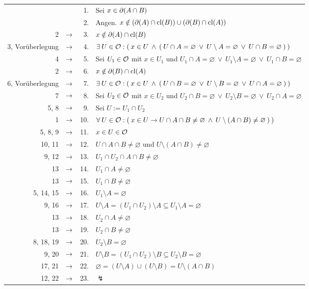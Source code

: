     \begin{longtable}{r c r l}
        & & 1. & Sei $x \in \partial(A \cap B)$ \\
        & & 2. & Angen. $x \notin (\partial(A) \cap \text{cl}(B)) \cup (\partial(B) \cap \text{cl}(A))$ \\
        2 & $\rightarrow$ & 3. & $x \notin \partial(A) \cap \text{cl}(B)$ \\
        3, Vorüberlegung & $\rightarrow$ & 4. & $\exists\: U \in \mathcal{O}: (\: x \in U \:\land\: (\: U \cap A = \varnothing \:\lor\: U \setminus A = \varnothing \:\lor\: U \cap B = \varnothing \:) \:) $ \\
        4 & $\rightarrow$ & 5. & Sei $U_1 \in \mathcal{O}$ mit $x \in U_1$ und $U_1 \cap A = \varnothing \:\lor\: U_1 \setminus A = \varnothing \:\lor\: U_1 \cap B = \varnothing$ \\
        2 & $\rightarrow$ & 6. & $x \notin \partial(B) \cap \text{cl}(A)$ \\
        6, Vorüberlegung & $\rightarrow$ & 7. & $\exists\: U \in \mathcal{O}: (\: x \in U \:\land\: (\: U \cap B = \varnothing \:\lor\: U \setminus B = \varnothing \:\lor\: U \cap A = \varnothing \:) \:)$ \\
        7 & $\rightarrow$ & 8. & Sei $U_2 \in \mathcal{O}$ mit $x \in U_2$ und $U_2 \cap B = \varnothing \:\lor\: U_2 \setminus B = \varnothing \:\lor\: U_2 \cap A = \varnothing$\\
        5, 8 & $\rightarrow$ & 9. & Sei $U := U_1 \cap U_2$ \\
        1 & $\rightarrow$ & 10. & $\forall\: U \in \mathcal{O}: (\: x \in U \to U \cap A \cap B \neq \varnothing \:\land\: U \setminus (A \cap B) \neq \varnothing \:) \:) $ \\
        5, 8, 9 & $\rightarrow$ & 11. & $x \in U \in \mathcal{O}$ \\
        10, 11 & $\rightarrow$ & 12. & $U \cap A \cap B \neq \varnothing$ und $U \setminus (A \cap B) \neq \varnothing$ \\
        9, 12 & $\rightarrow$ & 13. & $U_1 \cap U_2 \cap A \cap B \neq \varnothing$ \\
        13 & $\rightarrow$ & 14. & $U_1 \cap A \neq \varnothing$ \\
        13 & $\rightarrow$ & 15. & $U_1 \cap B \neq \varnothing$ \\
        5, 14, 15 & $\rightarrow$ & 16. & $U_1 \setminus A = \varnothing$ \\
        9, 16 & $\rightarrow$ & 17. & $U \setminus A = (U_1 \cap U_2) \setminus A \subseteq U_1 \setminus A = \varnothing$ \\
        13 & $\rightarrow$ & 18. & $U_2 \cap A \neq \varnothing$ \\
        13 & $\rightarrow$ & 19. & $U_2 \cap B \neq \varnothing$ \\
        8, 18, 19 & $\rightarrow$ & 20. & $U_2 \setminus B = \varnothing$ \\
        9, 20 & $\rightarrow$ & 21. & $U \setminus B = (U_1 \cap U_2) \setminus B \subseteq U_2 \setminus B = \varnothing $ \\
        17, 21 & $\rightarrow$ & 22. & $\varnothing = (U \setminus A) \cup (U \setminus B) = U \setminus (A \cap B) $ \\
        12, 22 & $\rightarrow$ & 23. & $\lightning$
    \end{longtable}


